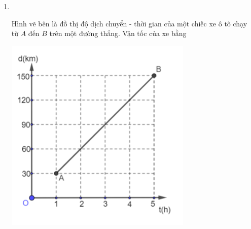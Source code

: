 \begin{enumerate}[label=\bfseries Câu \arabic*:,leftmargin=1.5cm]
\item {}\\
{\begin{minipage}[l]{0.6\textwidth}
		Hình vẽ bên là đồ thị độ dịch chuyển - thời gian của một chiếc xe ô tô chạy từ $A$ đến $B$ trên một đường thẳng. Vận tốc của xe bằng
	\end{minipage}
\begin{minipage}{0.4\textwidth}
		\begin{center}
			\includegraphics[width=0.6\linewidth]{../figs/VN10-2023-PH-TP005-P-5}
		\end{center}
	\end{minipage}
}



\end{enumerate}
